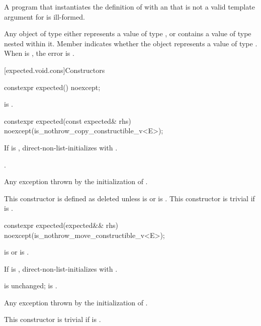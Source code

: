 \pnum
\mandates
A program that instantiates the definition of  with an  that is not a valid template argument for  is ill-formed.

\pnum
\remarks
Any object of type  either represents a value of type , or contains a value of type  nested within it. Member  indicates whether the  object represents a value of type . When  is , the error is .

[expected.void.cons]{Constructors}

%
\begin{itemdecl}
constexpr expected() noexcept;
\end{itemdecl}

\begin{itemdescr}
\pnum
\ensures
{} is .
\end{itemdescr}

%
\begin{itemdecl}
constexpr expected(const expected& rhs) noexcept(is_nothrow_copy_constructible_v<E>);
\end{itemdecl}

\begin{itemdescr}

\pnum
\effects
If  is , direct-non-list-initializes  with .

\pnum
\ensures
{}.

\pnum
\throws
Any exception thrown by the initialization of .

\pnum
\remarks
This constructor is defined as deleted unless  is  or  is . This constructor is trivial if  is .
\end{itemdescr}

%
\begin{itemdecl}
constexpr expected(expected&& rhs) noexcept(is_nothrow_move_constructible_v<E>);
\end{itemdecl}

\begin{itemdescr}
\pnum
\constraints
{} is  or  is .

\pnum
\effects
If  is , direct-non-list-initializes  with .

\pnum
\ensures
{} is unchanged;  is .

\pnum
\throws
Any exception thrown by the initialization of .

\pnum
\remarks
This constructor is trivial if  is .
\end{itemdescr}

